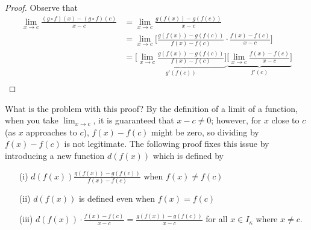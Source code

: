 \begin{proof}
Observe that 
\begin{align*}
    \lim_{ x \to c  }  \frac{ (g \circ f)(x) - (g \circ f)(c) }{x - c } &= \lim_{ x \to c  }  \frac{ g(f(x)) - g(f(c)) }{  x - c  }  \\
                                                                        &= \lim_{ x \to c  }  \Big[ \frac{ g(f(x)) - g(f(c)) }{  f(x) - f(c) } \cdot \frac{ f(x) - f(c) }{  x - c   } \Big] \\
                                                                        &= \underbrace{\Big[ \lim_{ x \to c  }  \frac{ g(f(x)) - g(f(c)) }{  f(x) - f(c) } \Big]}_{g'(f(c))} \underbrace{\Big[ \lim_{ x \to c  }  \frac{ f(x)  - f(c) }{  x - c  } \Big]}_{f'(c)} \\
\end{align*}
\end{proof}
What is the problem with this proof? By the definition of a limit of a function, when you take \( \lim_{ x \to c  }  \), it is guaranteed that \( x - c \neq 0   \); however, for \( x  \) close to \( c  \) (as \( x  \) approaches to \( c  \)), \( f(x)- f(c) \) might be zero, so dividing by \( f(x) - f(c) \) is not legitimate. The following proof fixes this issue by introducing a new function \( d(f(x)) \) which is defined by
\begin{enumerate}
    \item[(i)] \( d(f(x)) \displaystyle \frac{ g(f(x)) - g(f(c)) }{  f(x) - f(c) }    \) when \( f(x) \neq f(c) \) 
    \item[(ii)] \( d(f(x))  \) is defined even when \( f(x) = f(c) \)  
    \item[(iii)] \( \displaystyle d(f(x)) \cdot \frac{ f(x) - f(c) }{  x - c  }  = \frac{ g(f(x)) - g(f(c)) }{  x - c  }   \) for all \( x \in {I}_{\kappa} \) where \( x \neq c   \).
\end{enumerate}

